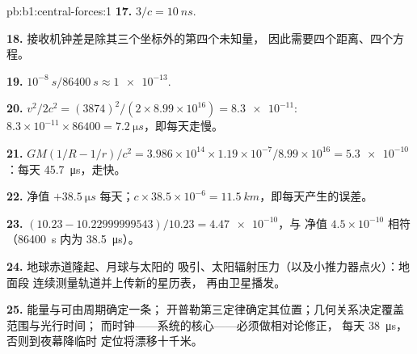 \begin{solution}{pb:b1:central-forces:1}
\textbf{17.} $3/c = \qty{10}{ns}$.

\textbf{18.} 接收机钟差是除其三个坐标外的第四个未知量，
因此需要四个距离、四个方程。

\textbf{19.} $10^{-8}\ \unit{s}/\qty{86400}{s} \approx \num{1e-13}$.

\textbf{20.} $v^2/2c^2 = (3874)^2/(2 \times 8.99\times10^{16}) = \num{8.3e-11}$:
$8.3\times10^{-11} \times 86400 = \qty{7.2}{\micro s}$，即每天走慢。

\textbf{21.} $GM(1/R - 1/r)/c^2 = 3.986\times10^{14} \times 1.19\times10^{-7}/
8.99\times10^{16} = \num{5.3e-10}$：每天 \qty{45.7}{\micro s}，走快。

\textbf{22.} 净值 $+\qty{38.5}{\micro s}$ 每天；$c \times 38.5\times10^{-6}
= \qty{11.5}{km}$，即每天产生的误差。

\textbf{23.} $(10.23 - 10.22999999543)/10.23 = \num{4.47e-10}$，与
净值 $4.5\times10^{-10}$ 相符（\qty{86400}{s} 内为 \qty{38.5}{\micro s}）。

\textbf{24.} 地球赤道隆起、月球与太阳的
吸引、太阳辐射压力（以及小推力器点火）：地面段
连续测量轨道并上传新的星历表，
再由卫星播发。

\textbf{25.} 能量与可由周期确定一条；
开普勒第三定律确定其位置；几何关系决定覆盖范围与光行时间；
而时钟——系统的核心——必须做相对论修正，
每天 \qty{38}{\micro s}，否则到夜幕降临时
定位将漂移十千米。
\end{solution}
